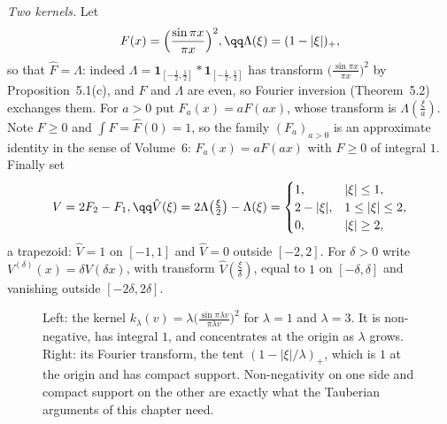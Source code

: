 \emph{Two kernels.} Let
\[
F(x)=\Bigl(\frac{\sin\pi x}{\pi x}\Bigr)^2,\qq\Lambda(\xi)=(1-|\xi|)_+,
\]
so that $\hat F=\Lambda$: indeed $\Lambda=\mathbf 1_{[-\frac12,\frac12]}*\mathbf 1_{[-\frac12,\frac12]}$ has transform $\bigl(\frac{\sin\pi x}{\pi x}\bigr)^2$ by
Proposition~5.1(c), and $F$ and $\Lambda$ are even, so Fourier inversion (Theorem~5.2) exchanges them. For $a>0$ put $F_a(x)=aF(ax)$, whose transform is
$\Lambda(\frac\xi a)$. Note $F\ge0$ and $\int F=\hat F(0)=1$, so the family $(F_a)_{a>0}$ is an approximate identity in the sense of Volume~6: $F_a(x)=a F(ax)$ with
$F\ge0$ of integral $1$. Finally set
\[
V=2F_2-F_1,\qq \hat V(\xi)=2\Lambda\bigl(\tfrac\xi2\bigr)-\Lambda(\xi)=\begin{cases}1,&|\xi|\le1,\\2-|\xi|,&1\le|\xi|\le2,\\0,&|\xi|\ge2,\end{cases}
\]
a trapezoid: $\hat V=1$ on $[-1,1]$ and $\hat V=0$ outside $[-2,2]$. For $\delta>0$ write $V^{(\delta)}(x)=\delta V(\delta x)$, with transform $\hat V(\frac\xi\delta)$, equal to
$1$ on $[-\delta,\delta]$ and vanishing outside $[-2\delta,2\delta]$.

\begin{figure}[ht]
\centering
{}
\caption{Left: the kernel $k_\lambda(v)=\lambda\bigl(\frac{\sin\pi\lambda v}{\pi\lambda v}\bigr)^2$ for $\lambda=1$ and $\lambda=3$. It is non-negative, has
integral $1$, and concentrates at the origin as $\lambda$ grows. Right: its Fourier transform, the tent $(1-|\xi|/\lambda)_+$, which is $1$ at the origin and
has compact support. Non-negativity on one side and compact support on the other are exactly what the Tauberian arguments of this chapter need.}
\label{fig:fejerkernel}
\end{figure}

